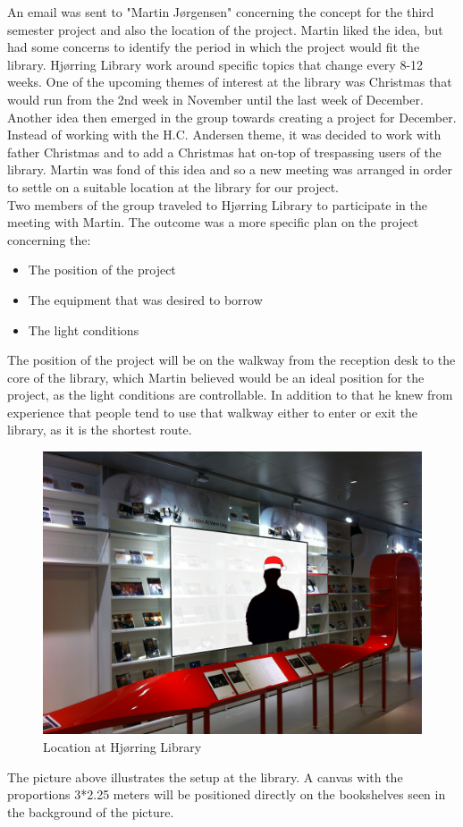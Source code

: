 An email was sent to "Martin Jørgensen" concerning the concept for the third semester project and also the location of the project. Martin liked the idea, but had some concerns to identify the period in which the project would fit the library. Hjørring Library work around specific topics that change every 8-12 weeks. One of the upcoming themes of interest at the library was Christmas that would run from the 2nd week in November until the last week of December. Another idea then emerged in the group towards creating a project for December. Instead of working with the H.C. Andersen theme, it was decided to work with father Christmas and to add a Christmas hat on-top of trespassing users of the library. Martin was fond of this idea and so a new meeting was arranged in order to settle on a suitable location at the library for our project.\\
Two members of the group traveled to Hjørring Library to participate in the meeting with Martin. The outcome was a more specific plan on the project concerning the:

\begin{itemize}
\item The position of the project
\item The equipment that was desired to borrow
\item The light conditions
\end{itemize}

The position of the project will be on the walkway from the reception desk to the core of the library, which Martin believed would be an ideal position for the project, as the light conditions are controllable. In addition to that he knew from experience that people tend to use that walkway either to enter or exit the library, as it is the shortest route.

\begin{figure}[htbp]
\centering
\includegraphics[width=1.00\textwidth]{Pictures/HjoerringLibrary/LocationJohannesHat.jpg}
\caption{Location at Hjørring Library}
\label{fig:Location at Hjørring Library}
\end{figure}
The picture above illustrates the setup at the library. A canvas with the proportions 3*2.25 meters will be positioned directly on the bookshelves seen in the background of the picture.


